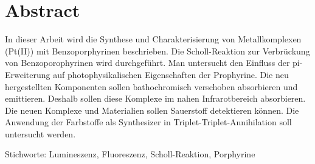 

\chapter*{Abstract}
\label{cha:abstract}
In dieser Arbeit wird die Synthese und Charakterisierung von Metallkomplexen (Pt(II)) mit Benzoporphyrinen beschrieben. Die Scholl-Reaktion zur Verbrückung von Benzoporophyrinen wird durchgeführt. Man untersucht den Einfluss der pi-Erweiterung auf photophysikalischen Eigenschaften der Prophyrine. Die neu hergestellten Komponenten sollen bathochromisch verschoben absorbieren und emittieren. Deshalb sollen diese Komplexe im nahen Infrarotbereich absorbieren. Die neuen Komplexe und Materialien sollen Sauerstoff detektieren können.
Die Anwendung der Farbstoffe als Synthesizer in Triplet-Triplet-Annihilation soll untersucht werden.

Stichworte: Lumineszenz, Fluoreszenz, Scholl-Reaktion, Porphyrine

